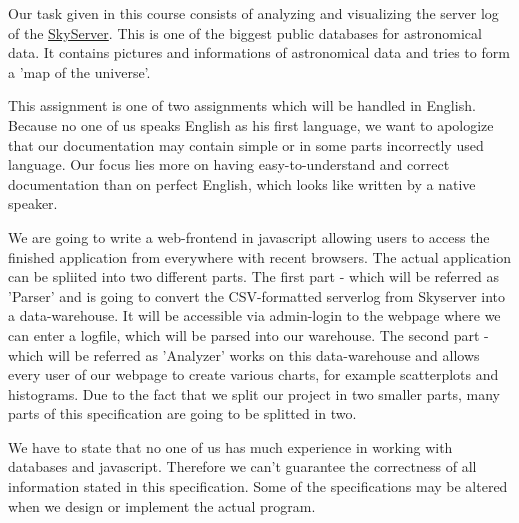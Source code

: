 Our task given in this course consists of
analyzing and visualizing the server log of the 
\href{http://skyserver.sdss.org/public/en/}{SkyServer}.
This is one of the biggest public databases for astronomical data. 
It contains pictures and informations of astronomical data
and tries to form a 'map of the universe'.

This assignment is one of two assignments which will be handled 
in English.
Because no one of us speaks English as his first language, 
we want to apologize that our documentation may contain simple 
or in some parts incorrectly used language. Our focus lies more on 
having easy-to-understand and correct documentation 
than on perfect English, which looks like written by a native speaker.

We are going to write a web-frontend in javascript allowing users 
to access the finished application from everywhere
with recent browsers. The actual application can be spliited into two 
different parts. The first part - which will be referred as 'Parser' and is going to convert the CSV-formatted 
serverlog from Skyserver into a data-warehouse. It will
be accessible via admin-login to the webpage where we can enter a 
logfile, which will be parsed into our warehouse.
The second part - which will be referred as 'Analyzer' works on this data-warehouse 
and allows every user of our webpage to create various charts, 
for example scatterplots and histograms.
Due to the fact that we split our project in two smaller parts, 
many parts of this specification are going to be splitted in two.

We have to state that no one of us has much experience in working 
with databases and javascript.
Therefore we can't guarantee the correctness of all information 
stated in this specification. Some of the specifications may be altered when we design or 
implement the actual program.
